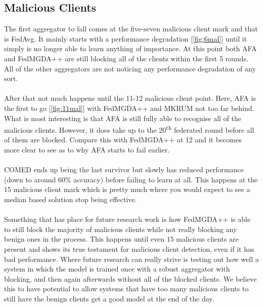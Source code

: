 \subsection{Malicious Clients}
The first aggregator to fall comes at the five-seven malicious client mark and that is FedAvg.
It mainly starts with a performance degradation [\ref{fig:6mal}] until it simply is no longer able to learn anything of importance.
At this point both AFA and FedMGDA++ are still blocking all of the clients within the first 5 rounds.
All of the other aggregators are not noticing any performance degradation of any sort.
\\ \\
After that not much happens until the 11-12 malicious client point.
Here, AFA is the first to go [\ref{fig:11mal}] with FedMGDA++ and MKRUM not too far behind.
What is most interesting is that AFA is still fully able to recognise all of the malicious clients.
However, it does take up to the 20\textsuperscript{th} federated round before all of them are blocked.
Compare this with FedMGDA++ at 12 and it becomes more clear to see as to why AFA starts to fail earlier.
\\ \\
COMED ends up being the last survivor but slowly has reduced performance (down to around 60\% accuracy) before failing to learn at all.
This happens at the 15 malicious client mark which is pretty much where you would expect to see a median based solution stop being effective.
\\ \\
Something that has place for future research work is how FedMGDA++ is able to still block the majority of malicious clients while not really blocking any benign ones in the process.
This happens until even 15 malicious clients are present and shows its true testament for malicious client detection, even if it has bad performance.
Where future research can really strive is testing out how well a system in which the model is trained once with a robust aggregator with blocking, and then again afterwards without all of the blocked clients.
We believe this to have potential to allow systems that have too many malicious clients to still have the benign clients get a good model at the end of the day.


